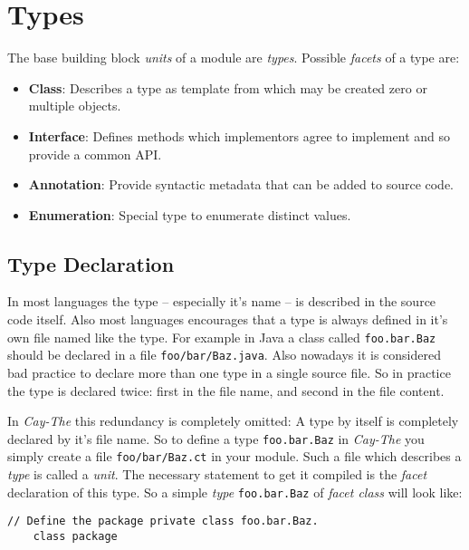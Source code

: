 \documentclass[11pt,a4paper]{report}
\begin{document}
\section{Types}


The base building block \textit{units} of a module are \textit{types}. Possible \textit{facets} of a type are:

\begin{itemize}
    \item \textbf{Class}: Describes a type as template from which may be created zero or multiple objects.
    \item \textbf{Interface}: Defines methods which implementors agree to implement and so provide a common API.
    \item \textbf{Annotation}: Provide syntactic metadata that can be added to source code.
    \item \textbf{Enumeration}: Special type to enumerate distinct values.
\end{itemize}

\subsection{Type Declaration}

In most languages the type -- especially it's name -- is described in the source code itself. Also most languages encourages that a type is always defined in it's own file named like the type. For example in Java a class called \texttt{foo.bar.Baz} should be declared in a file \texttt{foo/bar/Baz.java}. Also nowadays it is considered bad practice to declare more than one type in a single source file. So in practice the type is declared twice: first in the file name, and second in the file content.

In \textit{Cay-The} this redundancy is completely omitted: A type by itself is completely declared by it's file name. So to define a type \texttt{foo.bar.Baz} in \textit{Cay-The} you simply create a file \texttt{foo/bar/Baz.ct} in your module. Such a file which describes a \textit{type} is called a \textit{unit}. The necessary statement to get it compiled is the \textit{facet} declaration of this type. So a simple \textit{type} \texttt{foo.bar.Baz} of \textit{facet class} will look like:

\begin{lstlisting}[language=CayThe, title=foo/bar/Baz.ct]
    // Define the package private class foo.bar.Baz.
    class package
\end{lstlisting}
\end{document}

